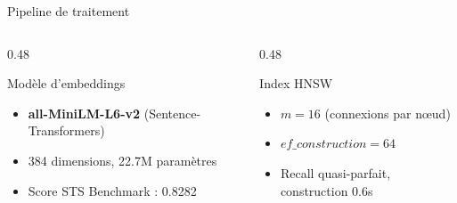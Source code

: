 \documentclass[aspectratio=169, 10pt]{beamer}
\begin{document}
\begin{frame}{Pipeline de traitement}
  \vspace{1em}
  \begin{columns}[T]
    \begin{column}{0.48\textwidth}
      \begin{block}{Mod\`{e}le d'embeddings}
        \begin{itemize}
          \item \textbf{all-MiniLM-L6-v2} (Sentence-Transformers)
          \item 384 dimensions, 22.7M param\`{e}tres
          \item Score STS Benchmark : 0.8282
        \end{itemize}
      \end{block}
    \end{column}
    \begin{column}{0.48\textwidth}
      \begin{block}{Index HNSW}
        \begin{itemize}
          \item $m=16$ (connexions par n\oe ud)
          \item $ef\_construction=64$
          \item Recall quasi-parfait, construction 0.6s
        \end{itemize}
      \end{block}
    \end{column}
  \end{columns}
\end{frame}
\end{document}
